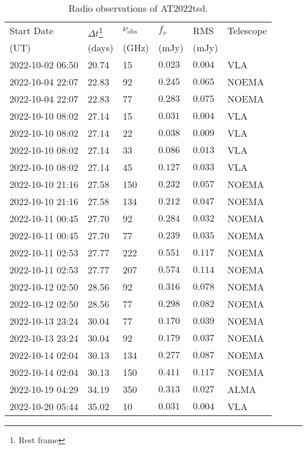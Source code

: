 \documentclass{nature_plusfigure}
\begin{document}
\begin{supplement}
\begin{center} 
\begin{longtable}{llllll} 
\caption{Radio observations of AT2022tsd.} 
\label{tab:radio-observations}\\ 
\hline\hline
Start Date & $\Delta t$\footnote{Rest frame} & $\nu_\mathrm{obs}$ & $f_\nu$ & RMS & Telescope\\ 
(UT) & (days) & (GHz) & (mJy) & (mJy) & \\ 
\hline
2022-10-02 06:50 & 20.74 & 15 & $0.023$ & $0.004$ & VLA \\ 
2022-10-04 22:07 & 22.83 & 92 & $0.245$ & $0.065$ & NOEMA \\ 
2022-10-04 22:07 & 22.83 & 77 & $0.283$ & $0.075$ & NOEMA \\ 
2022-10-10 08:02 & 27.14 & 15 & $0.031$ & $0.004$ & VLA \\ 
2022-10-10 08:02 & 27.14 & 22 & $0.038$ & $0.009$ & VLA \\ 
2022-10-10 08:02 & 27.14 & 33 & $0.086$ & $0.013$ & VLA \\ 
2022-10-10 08:02 & 27.14 & 45 & $0.127$ & $0.033$ & VLA \\ 
2022-10-10 21:16 & 27.58 & 150 & $0.232$ & $0.057$ & NOEMA \\ 
2022-10-10 21:16 & 27.58 & 134 & $0.212$ & $0.047$ & NOEMA \\ 
2022-10-11 00:45 & 27.70 & 92 & $0.284$ & $0.032$ & NOEMA \\ 
2022-10-11 00:45 & 27.70 & 77 & $0.239$ & $0.035$ & NOEMA \\ 
2022-10-11 02:53 & 27.77 & 222 & $0.551$ & $0.117$ & NOEMA \\ 
2022-10-11 02:53 & 27.77 & 207 & $0.574$ & $0.114$ & NOEMA \\ 
2022-10-12 02:50 & 28.56 & 92 & $0.316$ & $0.078$ & NOEMA \\ 
2022-10-12 02:50 & 28.56 & 77 & $0.298$ & $0.082$ & NOEMA \\ 
2022-10-13 23:24 & 30.04 & 77 & $0.170$ & $0.039$ & NOEMA \\ 
2022-10-13 23:24 & 30.04 & 92 & $0.179$ & $0.037$ & NOEMA \\ 
2022-10-14 02:04 & 30.13 & 134 & $0.277$ & $0.087$ & NOEMA \\ 
2022-10-14 02:04 & 30.13 & 150 & $0.411$ & $0.117$ & NOEMA \\ 
2022-10-19 04:29 & 34.19 & 350 & $0.313$ & $0.027$ & ALMA \\ 
2022-10-20 05:44 & 35.02 & 10 & $0.031$ & $0.004$ & VLA \\ 

\end{longtable}
\end{center}
\end{supplement}
\end{document}
